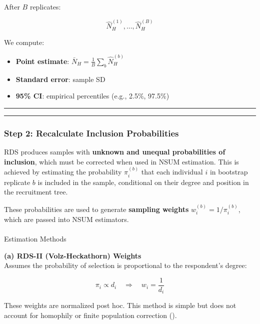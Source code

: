 \documentclass[
  12pt,
  letterpaper,
  DIV=11,
  numbers=noendperiod]{scrartcl}
\makeatletter
\let\oldparagraph\paragraph
\renewcommand{\paragraph}{
    \@ifstar
      \xxxParagraphStar
      \xxxParagraphNoStar
  }
\newcommand{\xxxParagraphStar}[1]{\oldparagraph*{#1}\mbox{}}
\newcommand{\xxxParagraphNoStar}[1]{\oldparagraph{#1}\mbox{}}
\theoremstyle{plain}
\theoremstyle{definition}
\makeatother
\begin{document}
After \(B\) replicates:

\[\hat{N}_H^{(1)}, \dots, \hat{N}_H^{(B)}\]

We compute:

\begin{itemize}
\item
  \textbf{Point estimate}:
  \(\bar{N}_H = \frac{1}{B} \sum_b \hat{N}_H^{(b)}\)
\item
  \textbf{Standard error}: sample SD
\item
  \textbf{95\% CI}: empirical percentiles (e.g., 2.5\%, 97.5\%)
\end{itemize}

\begin{center}\rule{0.5\linewidth}{0.5pt}\end{center}

\begin{center}\rule{0.5\linewidth}{0.5pt}\end{center}

\subsubsection{Step 2: Recalculate Inclusion
Probabilities}\label{step-2-recalculate-inclusion-probabilities}

RDS produces samples with \textbf{unknown and unequal probabilities of
inclusion}, which must be corrected when used in NSUM estimation. This
is achieved by estimating the probability \(\pi_i^{(b)}\) that each
individual \(i\) in bootstrap replicate \(b\) is included in the sample,
conditional on their degree and position in the recruitment tree.

These probabilities are used to generate \textbf{sampling weights}
\(w_i^{(b)} = 1/\pi_i^{(b)}\), which are passed into NSUM estimators.

\paragraph{Estimation Methods}\label{estimation-methods-1}

\textbf{(a) RDS-II (Volz-Heckathorn) Weights}\\
Assumes the probability of selection is proportional to the respondent's
degree:

\[\pi_i \propto d_i \quad \Rightarrow \quad w_i = \frac{1}{d_i}\]

These weights are normalized post hoc. This method is simple but does
not account for homophily or finite population correction
(\textcite{volz08-rds}).
\end{document}
